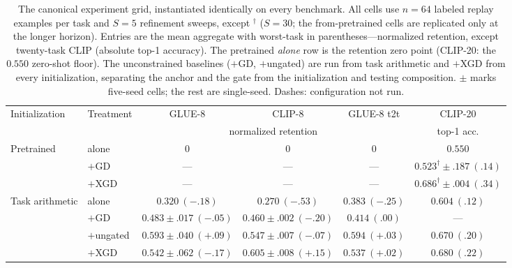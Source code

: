 \documentclass{article} %
\begin{document}
\iffalse
\begin{table}[t]
\centering
\scriptsize
\setlength{\tabcolsep}{3.5pt}
\caption{The canonical experiment grid, instantiated identically on every benchmark. All cells use $n=64$ labeled replay examples per task and $S=5$ refinement sweeps, except $^{\dagger}$ ($S=30$; the from-pretrained cells are replicated only at the longer horizon). Entries are the mean aggregate with worst-task in parentheses---normalized retention, except twenty-task CLIP (absolute top-1 accuracy). The pretrained \emph{alone} row is the retention zero point (CLIP-20: the $0.550$ zero-shot floor). The unconstrained baselines ($+$GD, $+$ungated) are run from task arithmetic and $+$XGD from every initialization, separating the anchor and the gate from the initialization and testing composition. $\pm$ marks five-seed cells; the rest are single-seed. Dashes: configuration not run.}
\label{tab:main}
\renewcommand{\arraystretch}{0.95}
\begin{tabular}{llcccc}
\toprule
Initialization & Treatment & GLUE-8 & CLIP-8 & GLUE-8 t2t & CLIP-20 \\
 & & \multicolumn{3}{c}{normalized retention} & top-1 acc. \\
\midrule
Pretrained      & alone      & $0$ & $0$ & $0$ & $0.550$ \\
                & $+$GD      & --- & --- & --- & $0.523^{\dagger}{\pm}.187\ (.14)$ \\
                & $+$XGD     & --- & --- & --- & $\mathbf{0.686^{\dagger}{\pm}.004}\ (.34)$ \\
\midrule
Task arithmetic & alone      & $0.320\ ({-}.18)$ & $0.270\ ({-}.53)$ & $0.383\ ({-}.25)$ & $0.604\ (.12)$ \\
                & $+$GD      & $0.483{\pm}.017\ ({-}.05)$ & $0.460{\pm}.002\ ({-}.20)$ & $0.414\ (.00)$ & --- \\
                & $+$ungated & $0.593{\pm}.040\ ({+}.09)$ & $0.547{\pm}.007\ ({-}.07)$ & $0.594\ ({+}.03)$ & $0.670\ (.20)$ \\
                & $+$XGD     & $0.542{\pm}.062\ ({-}.17)$ & $0.605{\pm}.008\ ({+}.15)$ & $0.537\ ({+}.02)$ & $0.680\ (.22)$ \\

\end{tabular}
\end{table}
\end{document}
